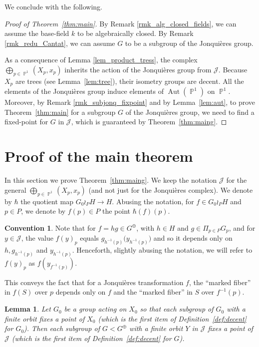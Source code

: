 \documentclass[11pt]{article}
\numberwithin{equation}{section}
\newcommand{\p}{\operatorname{\mathbb{P}}}\let\P\p
\newcommand{\Aut}{\operatorname{Aut}}
\newcommand{\Jon}{\mathscr{J}}
\theoremstyle{plain}
\newtheorem{lemma}[theorem]{Lemma}
\theoremstyle{definition}
\newtheorem{conv}[theorem]{Convention}
\begin{document}
{We conclude with the following.}

\begin{proof}[Proof of Theorem~\ref{thm:main}]
By Remark \ref{rmk_alg_closed_fields}, we can assume the {base-field $k$} to be algebraically closed. By Remark \ref{rmk_redu_Cantat}, we can assume $G$ to be a subgroup of the Jonquières group.

As a consequence of Lemma \ref{lem_product_tress}, the complex $\bigoplus_{p\in \p^1} (X_p,x_p)$ inherits the action of the Jonquières group from $\Jon$. Because $X_p$ are trees (see Lemma~\ref{lem:tree}), {their isometry groups are decent}. All the elements of the Jonquières group induce elements of $\Aut(\p^1)$ on $\p^1$.
Moreover, by Remark \ref{rmk_subjonq_fixpoint} and by Lemma~\ref{lem:aut}, to prove Theorem~\ref{thm:main} for a subgroup $G$ of the Jonquières group, we need to find a fixed-point for $G$ in $\Jon$, {which is guaranteed by} Theorem~\ref{thm:maing}.
\end{proof}

\section{Proof of the main theorem}
\label{sec:main}

In this section we prove Theorem~\ref{thm:maing}. We keep the notation $\Jon$ for the general $\bigoplus_{p\in \p^1} (X_p,x_p)$ (and not just for the Jonquières complex). We denote by $\hbar$ the quotient map $G_0\wr_P H\to H$. Abusing the notation, for $f\in G_0\wr_P H$ and $p\in P$, we denote by $f(p)\in P$ the point $\hbar(f)(p)$.

\begin{conv}
\label{conv:fibre}
Note that for $f=hg\in G^\oplus$, with $h\in H$ and $g\in\Pi_{p\in P} G_p$, and for $y\in \Jon$, the value $f(y)_p$ equals $g_{h^{-1}(p)}\big(y_{h^{-1}(p)}\big)$ and so it depends only on $h,g_{h^{-1}(p)}$ and $y_{h^{-1}(p)}$. Henceforth, slightly abusing the notation, we will refer to $f(y)_p$ as $f(y_{f^{-1}(p)})$.
\end{conv}

This conveys the fact that for a Jonquières transformation $f$, the ``marked fiber'' in $f(S)$ over $p$ depends only on $f$ and the ``marked fiber'' in $S$ over $f^{-1}(p)$.

{
\begin{lemma}
\label{lem:first_item}
Let $G_0$ be a group acting on $X_0$ so that each subgroup of $G_0$ with a finite orbit fixes a point of $X_0$ (which is the first item of Definition~\ref{def:decent} for $G_0$). Then each subgroup of $G<G^\oplus$ with a finite orbit $Y$ in $\Jon$ fixes a point of $\Jon$ (which is the first item of Definition~\ref{def:decent} for $G$).
\end{lemma}}
\end{document}

